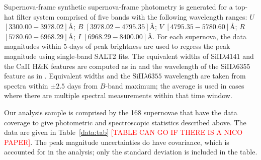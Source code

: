 \documentclass{aastex61}   	%
\begin{document}
Supernova-frame synthetic supernova-frame photometry is generated for a top-hat filter system
comprised of five 
bands with the following wavelength ranges: $U$ $[3300.00 - 3978.02]$\AA;
$B$ $[3978.02-4795.35]$\AA;
$V$ $[4795.35-5780.60]$\AA;
$R$ $[5780.60-6968.29]$\AA;
$I$ $[6968.29-8400.00]$\AA.
For each supernova, the data magnitudes within 5-days of peak brightness are used to regress the peak magnitude
using single-band SALT2 fits.
The equivalent widths of SiII$\lambda 4141$ and the CaII H\&K features are computed as
in \citet{2008A&A...477..717B} and the 
wavelength of the SiII$\lambda 6355$ feature
as in \citet{chotard:thesis}.
Equivalent widths and the
SiII$\lambda 6355$ wavelength are taken from spectra  within $\pm 2.5$ days from $B$-band maximum;
the average is used  in cases where there are multiple spectral measurements within that time window.

Our analysis sample is comprised by the
168
supernovae that have the data coverage to 
give photometric and spectroscopic statistics described above.
The data are given in Table~\ref{data:tab} \textcolor{red}{[TABLE CAN GO IF THERE IS A NICO PAPER]}.
The peak magnitude uncertainties do have covariance, which is accounted
for in the analysis; only the standard deviation is included in the table.
\end{document}
